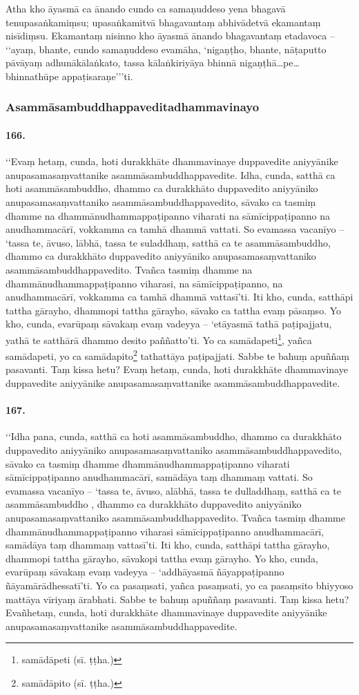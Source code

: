 Atha kho āyasmā ca ānando cundo ca samaṇuddeso yena bhagavā tenupasaṅkamiṃsu; upasaṅkamitvā bhagavantaṃ abhivādetvā ekamantaṃ nisīdiṃsu. Ekamantaṃ nisinno kho āyasmā ānando bhagavantaṃ etadavoca – ‘‘ayaṃ, bhante, cundo samaṇuddeso evamāha, ‘nigaṇṭho, bhante, nāṭaputto pāvāyaṃ adhunākālaṅkato, tassa kālaṅkiriyāya bhinnā nigaṇṭhā…pe… bhinnathūpe appaṭisaraṇe’’’ti.

\subsubsection{Asammāsambuddhappaveditadhammavinayo}

\paragraph{166.} ‘‘Evaṃ hetaṃ, cunda, hoti durakkhāte dhammavinaye duppavedite aniyyānike anupasamasaṃvattanike asammāsambuddhappavedite. Idha, cunda, satthā ca hoti asammāsambuddho, dhammo ca durakkhāto duppavedito aniyyāniko anupasamasaṃvattaniko asammāsambuddhappavedito, sāvako ca tasmiṃ dhamme na dhammānudhammappaṭipanno viharati na sāmīcippaṭipanno na anudhammacārī, vokkamma ca tamhā dhammā vattati. So evamassa vacanīyo – ‘tassa te, āvuso, lābhā, tassa te suladdhaṃ, satthā ca te asammāsambuddho, dhammo ca durakkhāto duppavedito aniyyāniko anupasamasaṃvattaniko asammāsambuddhappavedito. Tvañca tasmiṃ dhamme na dhammānudhammappaṭipanno viharasi, na sāmīcippaṭipanno, na anudhammacārī, vokkamma ca tamhā dhammā vattasī’ti. Iti kho, cunda, satthāpi tattha gārayho, dhammopi tattha gārayho, sāvako ca tattha evaṃ pāsaṃso. Yo kho, cunda, evarūpaṃ sāvakaṃ evaṃ vadeyya – ‘etāyasmā tathā paṭipajjatu, yathā te satthārā dhammo desito paññatto’ti. Yo ca samādapeti\footnote{samādāpeti (sī. ṭṭha.)}, yañca samādapeti, yo ca samādapito\footnote{samādāpito (sī. ṭṭha.)} tathattāya paṭipajjati. Sabbe te bahuṃ apuññaṃ pasavanti. Taṃ kissa hetu? Evaṃ hetaṃ, cunda, hoti durakkhāte dhammavinaye duppavedite aniyyānike anupasamasaṃvattanike asammāsambuddhappavedite.

\paragraph{167.} ‘‘Idha pana, cunda, satthā ca hoti asammāsambuddho, dhammo ca durakkhāto duppavedito aniyyāniko anupasamasaṃvattaniko asammāsambuddhappavedito, sāvako ca tasmiṃ dhamme dhammānudhammappaṭipanno viharati sāmīcippaṭipanno anudhammacārī, samādāya taṃ dhammaṃ vattati. So evamassa vacanīyo – ‘tassa te, āvuso, alābhā, tassa te dulladdhaṃ, satthā ca te asammāsambuddho , dhammo ca durakkhāto duppavedito aniyyāniko anupasamasaṃvattaniko asammāsambuddhappavedito. Tvañca tasmiṃ dhamme dhammānudhammappaṭipanno viharasi sāmīcippaṭipanno anudhammacārī, samādāya taṃ dhammaṃ vattasī’ti. Iti kho, cunda, satthāpi tattha gārayho, dhammopi tattha gārayho, sāvakopi tattha evaṃ gārayho. Yo kho, cunda, evarūpaṃ sāvakaṃ evaṃ vadeyya – ‘addhāyasmā ñāyappaṭipanno ñāyamārādhessatī’ti. Yo ca pasaṃsati, yañca pasaṃsati, yo ca pasaṃsito bhiyyoso mattāya vīriyaṃ ārabhati. Sabbe te bahuṃ apuññaṃ pasavanti. Taṃ kissa hetu? Evañhetaṃ, cunda, hoti durakkhāte dhammavinaye duppavedite aniyyānike anupasamasaṃvattanike asammāsambuddhappavedite.

